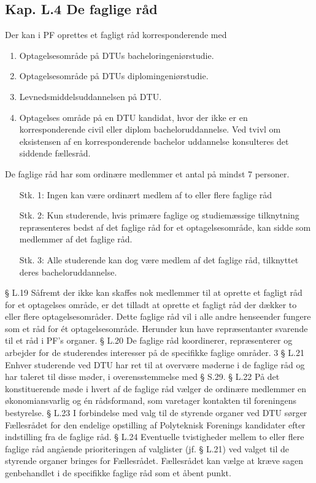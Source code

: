 \begin{list}
\subsection{Kap. L.4 De faglige råd}

\item Der kan i PF oprettes et fagligt råd korresponderende med
	\begin{enumerate}
	\item Optagelsesområde på DTUs bacheloringeniørstudie.
	\item Optagelsesområde på DTUs diplomingeniørstudie.
	\item Levnedsmiddelsuddannelsen på DTU.
	\item Optagelses område på en DTU kandidat, hvor der ikke er en korresponderende civil eller diplom bacheloruddannelse. Ved tvivl om eksistensen af en korresponderende bachelor uddannelse konsulteres det siddende fællesråd.
	\end{enumerate}     
    
\item De faglige råd har som ordinære medlemmer et antal på mindst 7 personer.
\begin{itemize}%
\item[Stk. 1:] Ingen kan være ordinært medlem af to eller flere faglige råd

\item[Stk. 2:] Kun studerende, hvis primære faglige og studiemæssige tilknytning repræsenteres bedst af det faglige råd for et optagelsesområde, kan sidde som medlemmer af det faglige råd.

\item[Stk. 3:] Alle studerende kan dog være medlem af det faglige råd, tilknyttet deres bacheloruddannelse.

\end{itemize}

§ L.19 Såfremt der ikke kan skaffes nok medlemmer til at oprette et fagligt råd for et optagelses område, er det
          tilladt at oprette et fagligt råd der dækker to eller flere optagelsesområder. Dette faglige råd vil i alle andre
             henseender fungere som et råd for ét optagelsesområde. Herunder kun have repræsentanter svarende til et råd
                 i PF’s organer.
§ L.20 De faglige råd koordinerer, repræsenterer og arbejder for de studerendes interesser på de specifikke faglige
          områder.
3
§ L.21 Enhver studerende ved DTU har ret til at overvære møderne i de faglige råd og har taleret til disse møder, i
           overensstemmelse med § S.29.
§ L.22 På det konstituerende møde i hvert af de faglige råd vælger de ordinære medlemmer en økonomiansvarlig og
             én rådsformand, som varetager kontakten til foreningens bestyrelse.
§ L.23 I forbindelse med valg til de styrende organer ved DTU sørger Fællesrådet for den endelige opstilling af
          Polyteknisk Forenings kandidater efter indstilling fra de faglige råd.
§ L.24 Eventuelle tvistigheder mellem to eller flere faglige råd angående prioriteringen af valglister (jf. § L.21) ved
          valget til de styrende organer bringes for Fællesrådet. Fællesrådet kan vælge at kræve sagen genbehandlet i
               de specifikke faglige råd som et åbent punkt.

\end{list}
